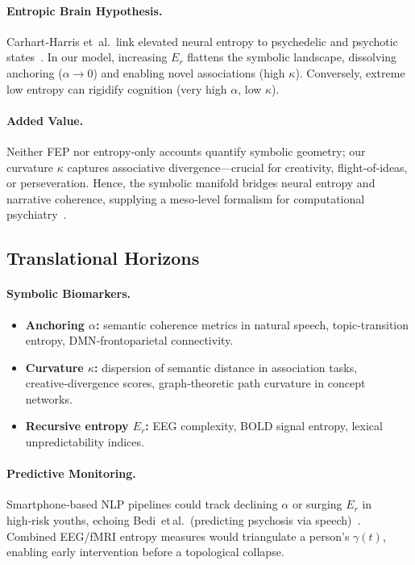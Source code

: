 \paragraph{Entropic Brain Hypothesis.}  Carhart‑Harris et al.\ link elevated neural entropy to psychedelic and psychotic states \cite{carhart2014entropic}. In our model, increasing $E_r$ flattens the symbolic landscape, dissolving anchoring ($\alpha \to 0$) and enabling novel associations (high $\kappa$). Conversely, extreme low entropy can rigidify cognition (very high $\alpha$, low $\kappa$).

\paragraph{Added Value.}  Neither FEP nor entropy‑only accounts quantify symbolic geometry; our curvature $\kappa$ captures associative divergence—crucial for creativity, flight‑of‑ideas, or perseveration. Hence, the symbolic manifold bridges neural entropy and narrative coherence, supplying a meso‑level formalism for computational psychiatry \cite{adams2016comp}.

\subsection*{Translational Horizons}

\paragraph{Symbolic Biomarkers.}
\begin{itemize}
    \item \textbf{Anchoring $\alpha$:} semantic coherence metrics in natural speech, topic‑transition entropy, DMN‑frontoparietal connectivity.
    \item \textbf{Curvature $\kappa$:} dispersion of semantic distance in association tasks, creative‑divergence scores, graph‑theoretic path curvature in concept networks.
    \item \textbf{Recursive entropy $E_r$:} EEG complexity, BOLD signal entropy, lexical unpredictability indices.
\end{itemize}

\paragraph{Predictive Monitoring.}  Smartphone‑based NLP pipelines could track declining $\alpha$ or surging $E_r$ in high‑risk youths, echoing Bedi et al.\ (predicting psychosis via speech) \cite{bedi2015speech}. Combined EEG/fMRI entropy measures would triangulate a person’s $\gamma(t)$, enabling early intervention before a topological collapse.

